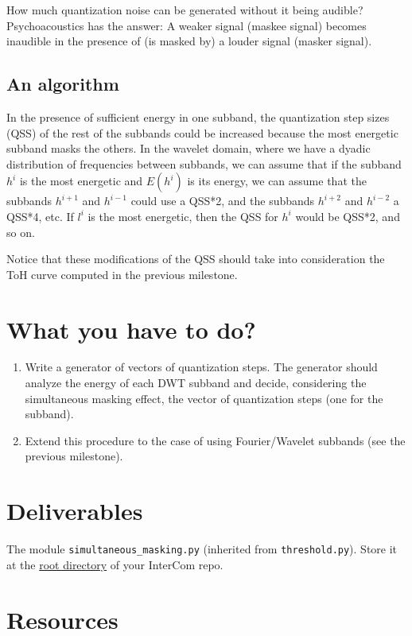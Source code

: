 How much quantization noise can be generated without it being audible?
Psychoacoustics has the answer: A weaker signal (maskee signal) becomes
inaudible in the presence of (is masked by) a louder signal (masker signal). 

\subsection{An algorithm}

In the presence of sufficient energy in one subband, the quantization
step sizes (QSS) of the rest of the subbands could be increased
because the most energetic subband masks the others. In the wavelet
domain, where we have a dyadic distribution of frequencies between
subbands, we can assume that if the subband $h^i$ is the most
energetic and $E(h^i)$ is its energy, we can assume that the subbands
$h^{i+1}$ and $h^{i-1}$ could use a QSS*2, and the subbands $h^{i+2}$
and $h^{i-2}$ a QSS*4, etc. If $l^i$ is the most energetic, then the
QSS for $h^i$ would be QSS*2, and so on.

Notice that these modifications of the QSS should take into
consideration the ToH curve computed in the previous milestone.
  
\section{What you have to do?}

\begin{enumerate}
\item Write a generator of vectors of quantization steps. The
  generator should analyze the energy of each DWT subband and decide,
  considering the simultaneous masking effect, the vector of
  quantization steps (one for the subband).
\item Extend this procedure to the case of using Fourier/Wavelet
  subbands (see the previous milestone).
\end{enumerate}

\section{Deliverables}

The module \verb|simultaneous_masking.py| (inherited from
\verb|threshold.py|). Store it at the
\href{https://github.com/Tecnologias-multimedia/intercom}{root
  directory} of your InterCom repo.

\section{Resources}



